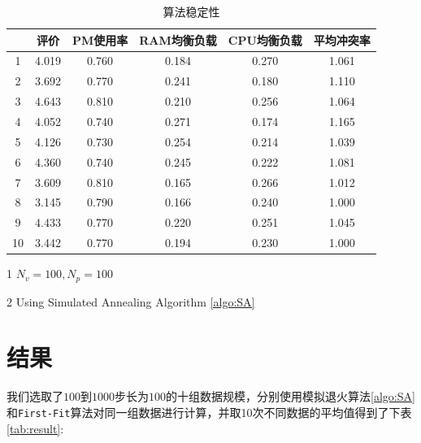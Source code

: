 \begin{table}[htbp]
  \centering
  \small
  \begin{threeparttable}
    \caption{\label{tab:stability}算法稳定性}
    \begin{tabular}{cccccc}
      \toprule
        & 评价 & PM使用率 & RAM均衡负载 & CPU均衡负载 & 平均冲突率 \\
      \midrule
      1 & 4.019 & 0.760 & 0.184 & 0.270 & 1.061 \\
      2 & 3.692 & 0.770 & 0.241 & 0.180 & 1.110 \\
      3 & 4.643 & 0.810 & 0.210 & 0.256 & 1.064 \\
      4 & 4.052 & 0.740 & 0.271 & 0.174 & 1.165 \\
      5 & 4.126 & 0.730 & 0.254 & 0.214 & 1.039 \\
      6 & 4.360 & 0.740 & 0.245 & 0.222 & 1.081 \\
      7 & 3.609 & 0.810 & 0.165 & 0.266 & 1.012 \\
      8 & 3.145 & 0.790 & 0.166 & 0.240 & 1.000 \\
      9 & 4.433 & 0.770 & 0.220 & 0.251 & 1.045 \\
     10 & 3.442 & 0.770 & 0.194 & 0.230 & 1.000 \\
      \bottomrule
    \end{tabular}
    \tiny
    \begin{tablenotes}
    \item [1]$N_v = 100,N_p = 100$

    \item [2] Using Simulated Annealing Algorithm \ref{algo:SA}
    \end{tablenotes}
  \end{threeparttable}
\end{table}

\section{结果}
我们选取了$100$到$1000$步长为$100$的十组数据规模，分别使用模拟退火算法\ref{algo:SA}和\texttt{First-Fit}算法对同一组数据进行计算，并取10次不同数据的平均值得到了下表\ref{tab:result}:

